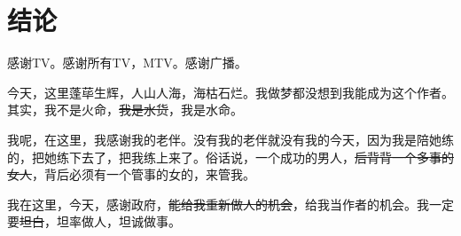 \documentclass{HDU-Bachelor-Thesis}
\begin{document}
\clearpage
\section{结论}

\clearpage
{}

感谢TV。感谢所有TV，MTV。感谢广播。

今天，这里蓬荜生辉，人山人海，海枯石烂。我做梦都没想到我能成为这个作者。其实，我不是火命，\sout{我是水货}，我是水命。

我呢，在这里，我感谢我的老伴。没有我的老伴就没有我的今天，因为我是陪她练的，把她练下去了，把我练上来了。俗话说，一个成功的男人，\sout{后背背一个多事的女人}，背后必须有一个管事的女的，来管我。

我在这里，今天，感谢政府，\sout{能给我重新做人的机会}，给我当作者的机会。我一定要\sout{坦白}，坦率做人，坦诚做事。

\clearpage
\printbibliography[heading=bibintoc]

\clearpage
{}
\end{document}
